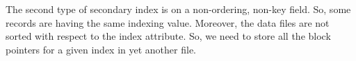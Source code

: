 \documentclass[a4paper, openany]{memoir}
\begin{document}


The second type of secondary index is on a non-ordering, non-key field. So, some records are having the same indexing value. Moreover, the data files are not sorted with respect to the index attribute. So, we need to store all the block pointers for a given index in yet another file. 
\end{document}
